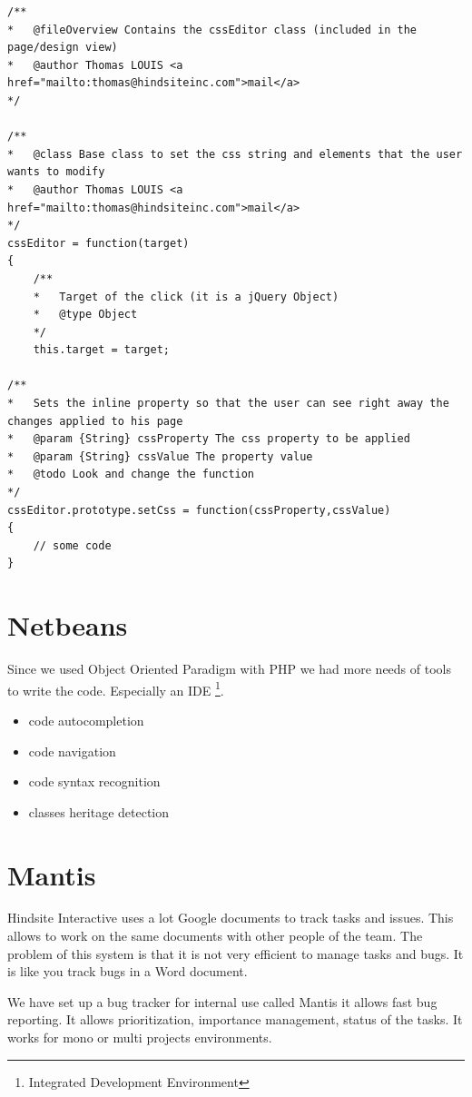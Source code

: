 \lstset{language=Javascript}
\begin{lstlisting}[label=jsdoc-code,caption=Javascript documentation in a Javascript class]
/**
*	@fileOverview Contains the cssEditor class (included in the page/design view)
*	@author Thomas LOUIS <a href="mailto:thomas@hindsiteinc.com">mail</a>
*/

/**
*	@class Base class to set the css string and elements that the user wants to modify
*	@author Thomas LOUIS <a href="mailto:thomas@hindsiteinc.com">mail</a>
*/
cssEditor = function(target)
{
	/**
	*	Target of the click (it is a jQuery Object)
	*	@type Object
	*/
	this.target = target;

/**
*	Sets the inline property so that the user can see right away the changes applied to his page
*	@param {String} cssProperty The css property to be applied
*	@param {String} cssValue The property value
*	@todo Look and change the function
*/
cssEditor.prototype.setCss = function(cssProperty,cssValue)
{
	// some code		
}

\end{lstlisting}

\section{Netbeans}

Since we used Object Oriented Paradigm with PHP we had more needs of tools 
to write the code. Especially an IDE \footnote{Integrated Development Environment}.

\begin{itemize}
\item code autocompletion
\item code navigation
\item code syntax recognition
\item classes heritage detection
\end{itemize}


\section{Mantis}
Hindsite Interactive uses a lot Google documents to track tasks and issues. This allows to work on the same documents with other people of the team. The problem of this system is that it is not very efficient to manage tasks and bugs. It is like you track bugs in a Word document.

We have set up  a bug tracker for internal use called Mantis it allows fast bug reporting. It allows prioritization, importance management, status of the tasks. It works for mono or multi projects environments.

